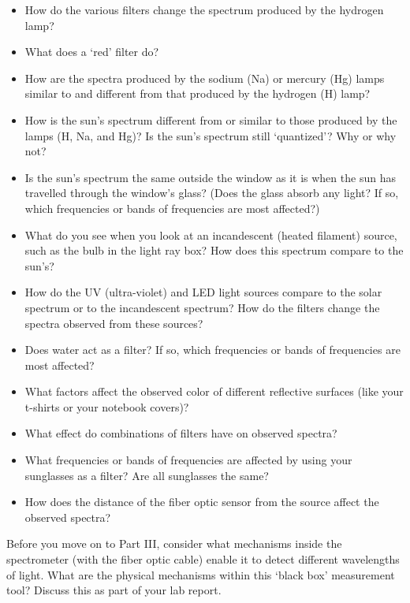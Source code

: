 \begin{itemize}
\itemsep-0.3em
\item How do the various filters change the spectrum produced by the hydrogen lamp?
\item What does a ‘red’ filter do?
\item How are the spectra produced by the sodium (Na) or mercury (Hg) lamps similar to and different from that produced by the hydrogen (H) lamp?
\item How is the sun’s spectrum different from or similar to those produced by the lamps (H, Na, and Hg)? Is the sun’s spectrum still ‘quantized’? Why or why not?
\item Is the sun’s spectrum the same outside the window as it is when the sun has travelled through the window’s glass? (Does the glass absorb any light? If so, which frequencies or bands of frequencies are most affected?)
\item What do you see when you look at an incandescent (heated filament) source, such as the bulb in the light ray box? How does this spectrum compare to the sun’s?
\item How do the UV (ultra-violet) and LED light sources compare to the solar spectrum or to the incandescent spectrum? How do the filters change the spectra observed from these sources?
\item Does water act as a filter? If so, which frequencies or bands of frequencies are most affected?
\item What factors affect the observed color of different reflective surfaces (like your t-shirts or your notebook covers)?
\item What effect do combinations of filters have on observed spectra?
\item What frequencies or bands of frequencies are affected by using your sunglasses as a filter? Are all sunglasses the same?
\item How does the distance of the fiber optic sensor from the source affect the observed spectra?
\end{itemize}
Before you move on to Part III, consider what mechanisms inside the spectrometer (with the fiber optic cable) enable it to detect different wavelengths of light. 
What are the physical mechanisms within this ‘black box’ measurement tool? 
Discuss this as part of your lab report.

